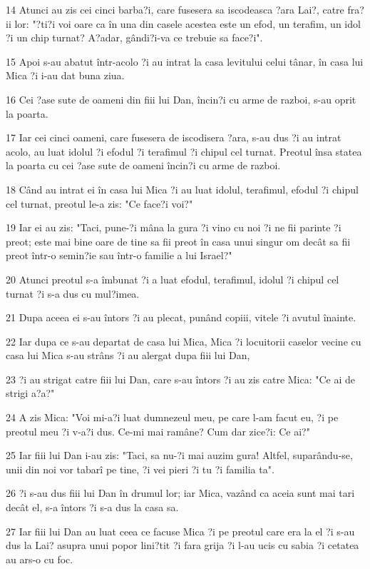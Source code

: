\par 14 Atunci au zis cei cinci barba?i, care fusesera sa iscodeasca ?ara Lai?, catre fra?ii lor: "?ti?i voi oare ca în una din casele acestea este un efod, un terafim, un idol ?i un chip turnat? A?adar, gândi?i-va ce trebuie sa face?i".
\par 15 Apoi s-au abatut într-acolo ?i au intrat la casa levitului celui tânar, în casa lui Mica ?i i-au dat buna ziua.
\par 16 Cei ?ase sute de oameni din fiii lui Dan, încin?i cu arme de razboi, s-au oprit la poarta.
\par 17 Iar cei cinci oameni, care fusesera de iscodisera ?ara, s-au dus ?i au intrat acolo, au luat idolul ?i efodul ?i terafimul ?i chipul cel turnat. Preotul însa statea la poarta cu cei ?ase sute de oameni încin?i cu arme de razboi.
\par 18 Când au intrat ei în casa lui Mica ?i au luat idolul, terafimul, efodul ?i chipul cel turnat, preotul le-a zis: "Ce face?i voi?"
\par 19 Iar ei au zis: "Taci, pune-?i mâna la gura ?i vino cu noi ?i ne fii parinte ?i preot; este mai bine oare de tine sa fii preot în casa unui singur om decât sa fii preot într-o semin?ie sau într-o familie a lui Israel?"
\par 20 Atunci preotul s-a îmbunat ?i a luat efodul, terafimul, idolul ?i chipul cel turnat ?i s-a dus cu mul?imea.
\par 21 Dupa aceea ei s-au întors ?i au plecat, punând copiii, vitele ?i avutul înainte.
\par 22 Iar dupa ce s-au departat de casa lui Mica, Mica ?i locuitorii caselor vecine cu casa lui Mica s-au strâns ?i au alergat dupa fiii lui Dan,
\par 23 ?i au strigat catre fiii lui Dan, care s-au întors ?i au zis catre Mica: "Ce ai de strigi a?a?"
\par 24 A zis Mica: "Voi mi-a?i luat dumnezeul meu, pe care l-am facut eu, ?i pe preotul meu ?i v-a?i dus. Ce-mi mai ramâne? Cum dar zice?i: Ce ai?"
\par 25 Iar fiii lui Dan i-au zis: "Taci, sa nu-?i mai auzim gura! Altfel, suparându-se, unii din noi vor tabarî pe tine, ?i vei pieri ?i tu ?i familia ta".
\par 26 ?i s-au dus fiii lui Dan în drumul lor; iar Mica, vazând ca aceia sunt mai tari decât el, s-a întors ?i s-a dus la casa sa.
\par 27 Iar fiii lui Dan au luat ceea ce facuse Mica ?i pe preotul care era la el ?i s-au dus la Lai? asupra unui popor lini?tit ?i fara grija ?i l-au ucis cu sabia ?i cetatea au ars-o cu foc.
